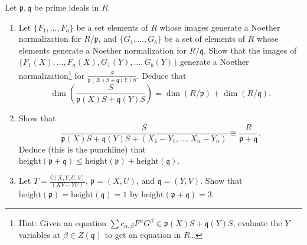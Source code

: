 \documentclass[12pt]{amsart}
\newcommand{\C}{\mathbb{C}}
\newcommand{\p}{\mathfrak{p}}
\newcommand{\q}{\mathfrak{q}}
\newcommand{\hgt}{\mathrm{height}}
\newcommand{\ds}{\displaystyle}
\begin{document}
\begin{enumerate}
 Let $\p,\q$ be prime ideals in $R$.
 \begin{enumerate}
\item Let $\{F_1,\dots,F_a\}$ be a set elements of $R$ whose images generate a Noether normalization for $R/\p$, and $\{G_1,\dots,G_b\}$ be a set of elements of $R$ whose elements generate a Noether normalization for $R/\q$. Show that the images of $\{F_1(X),\dots,F_a(X),G_1(Y),\dots,G_b(Y)\}$ generate a Noether normalization\footnote{Hint: Given an equation $\sum c_{\alpha,\beta} F^\alpha G^\beta \in \p(X) S + \q(Y) S$, evaluate the $Y$ variables at $\beta\in Z(\q)$ to get an equation in $R$\dots} for $\ds\frac{S}{\p(X) S + \q(Y)S}$. Deduce that 
\[\dim\left(\frac{S}{\p(X) S + \q(Y)S}\right) = \dim(R/\p) + \dim(R/\q).\]
\item Show that \[\frac{S}{\p(X) S + \q(Y)S + (X_1-Y_1,\dots,X_n-Y_n)}\cong \frac{R}{\p+\q}.\] Deduce (this is the punchline) that $\hgt(\p+\q) \leq \hgt(\p) + \hgt(\q)$.
\item Let $\ds T=\frac{\C[X,Y,U,V]}{(XV-YU)}$, $\p=(X,U)$, and $\q=(Y,V)$. Show that $\hgt(\p)=\hgt(\q)=1$ by $\hgt(\p+\q)=3$.
\end{enumerate}




\end{enumerate}
\end{document}
